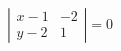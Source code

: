 \begin{displaymath}
\left \vert
\begin{array}{ll}
 x-1 & -2 \\ 
y-2 & 1
\end{array}
\right \vert =0
\end{displaymath}
